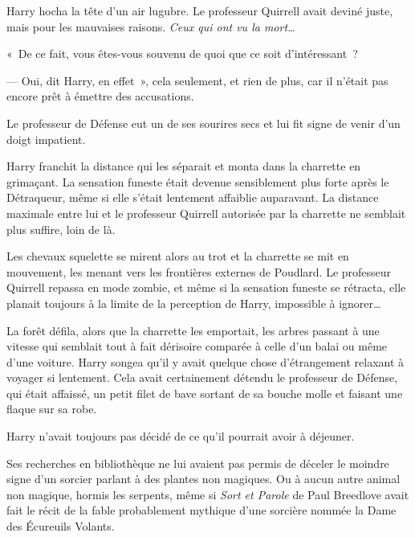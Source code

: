 Harry hocha la tête d'un air lugubre. Le professeur Quirrell avait deviné juste, mais pour les mauvaises raisons. \emph{Ceux qui ont vu la mort…}

«~De ce fait, vous êtes-vous souvenu de quoi que ce soit d'intéressant~?

--- Oui, dit Harry, en effet~», cela seulement, et rien de plus, car il n'était pas encore prêt à émettre des accusations.

Le professeur de Défense eut un de ses sourires secs et lui fit signe de venir d'un doigt impatient.

Harry franchit la distance qui les séparait et monta dans la charrette en grimaçant. La sensation funeste était devenue sensiblement plus forte après le Détraqueur, même si elle s'était lentement affaiblie auparavant. La distance maximale entre lui et le professeur Quirrell autorisée par la charrette ne semblait plus suffire, loin de là.

Les chevaux squelette se mirent alors au trot et la charrette se mit en mouvement, les menant vers les frontières externes de Poudlard. Le professeur Quirrell repassa en mode zombie, et même si la sensation funeste se rétracta, elle planait toujours à la limite de la perception de Harry, impossible à ignorer…

La forêt défila, alors que la charrette les emportait, les arbres passant à une vitesse qui semblait tout à fait dérisoire comparée à celle d'un balai ou même d'une voiture. Harry songea qu'il y avait quelque chose d'étrangement relaxant à voyager si lentement. Cela avait certainement détendu le professeur de Défense, qui était affaissé, un petit filet de bave sortant de sa bouche molle et faisant une flaque sur sa robe.

Harry n'avait toujours pas décidé de ce qu'il pourrait avoir à déjeuner.

Ses recherches en bibliothèque ne lui avaient pas permis de déceler le moindre signe d'un sorcier parlant à des plantes non magiques. Ou à aucun autre animal non magique, hormis les serpents, même si \emph{Sort et Parole} de Paul Breedlove avait fait le récit de la fable probablement mythique d'une sorcière nommée la Dame des Écureuils Volants.

